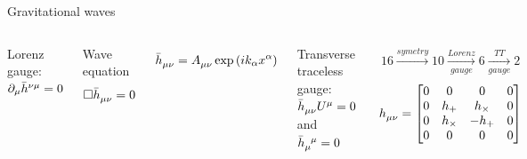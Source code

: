 \documentclass[pdf]{beamer}
\begin{document}
\begin{frame}{Gravitational waves}

	\begin{columns}
	\hspace{.5cm}
	Lorenz gauge: $\partial_\mu \tensor{\bar{h}}{^\nu^\mu} = 0$
	\begin{block}{Wave equation}
	\begin{equation*}
	\Box \tensor{\bar{h}}{_\mu_\nu} = 0
	\end{equation*}		
	\end{block}
	
	\begin{equation*}
	\tensor{\bar{h}}{_\mu_\nu} = \tensor{A}{_\mu_\nu} \exp{(ik_\alpha x^\alpha)}
	\end{equation*}
	
	Transverse traceless gauge: $\tensor{\bar{h}}{_\mu_\nu} U^\mu = 0$ and $\tensor{\bar{h}}{_\mu^\mu} = 0$
	
	
	\begin{align*}
	16 \xrightarrow{symetry} 10 \xrightarrow[gauge]{Lorenz} 6 \xrightarrow[gauge]{TT} 2
	\end{align*}		
	\begin{equation*}
	\tensor{h}{_\mu_\nu} = \begin{bmatrix}
	0&0&0&0\\
	0&h_+&h_\times&0\\
	0&h_\times&-h_+&0\\
	0&0&0&0
	\end{bmatrix}
	\end{equation*}		
	
\begin{figure}
\end{figure}		
	
	\end{columns}

\end{frame}
\end{document}
